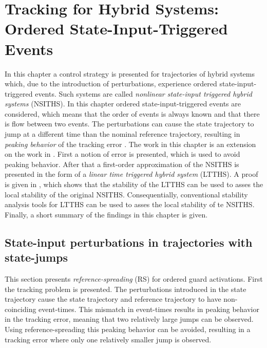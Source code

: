 \documentclass[../DC2017114Bouma.tex]{subfiles}
\begin{document}
\graphicspath{{03_Contribution/img/}}
\renewcommand{\chaptermark}[1]{\markboth{\thechapter.\ #1}{}}
\renewcommand{\sectionmark}[1]{\markright{#1}{}}

\pagestyle{fancyreport}
\cleartooddpage
\pagestyle{fancyreport}
\chapter{Tracking for Hybrid Systems: Ordered State-Input-Triggered Events}\label{ch:order}
In this chapter a control strategy is presented for trajectories of hybrid systems which, due to the introduction of perturbations, experience ordered state-input-triggered events. Such systems are called \textit{nonlinear state-input triggered hybrid systems} (NSITHS). In this chapter ordered state-input-triggered events are considered, which means that the order of events is always known and that there is flow between two events. The perturbations can cause the state trajectory to jump at a different time than the nominal reference trajectory, resulting in \textit{peaking behavior} of the tracking error \cite{Menini2001,Biemond2013}. The work in this chapter is an extension on the work in \cite{Rijnen2017}. First a notion of error is presented, which is used to avoid peaking behavior. After that a first-order approximation of the NSITHS is presented in the form of a \textit{linear time triggered hybrid system} (LTTHS). A proof is given in \cite{Rijnen2017}, which shows that the stability of the LTTHS can be used to asses the local stability of the original NSITHS. Consequentially, conventional stability analysis tools for LTTHS can be used to asses the local stability of te NSITHS. Finally, a short summary of the findings in this chapter is given.
%
%

\section{State-input perturbations in trajectories with state-jumps}
This section presents \textit{reference-spreading} (RS) for ordered guard activations. First the tracking problem is presented. The perturbations introduced in the state trajectory cause the state trajectory and reference trajectory to have non-coinciding event-times. This mismatch in event-times results in peaking behavior in the tracking error, meaning that two relatively large jumps can be observed. Using reference-spreading this peaking behavior can be avoided, resulting in a tracking error where only one relatively smaller jump is observed.
%
\end{document}

